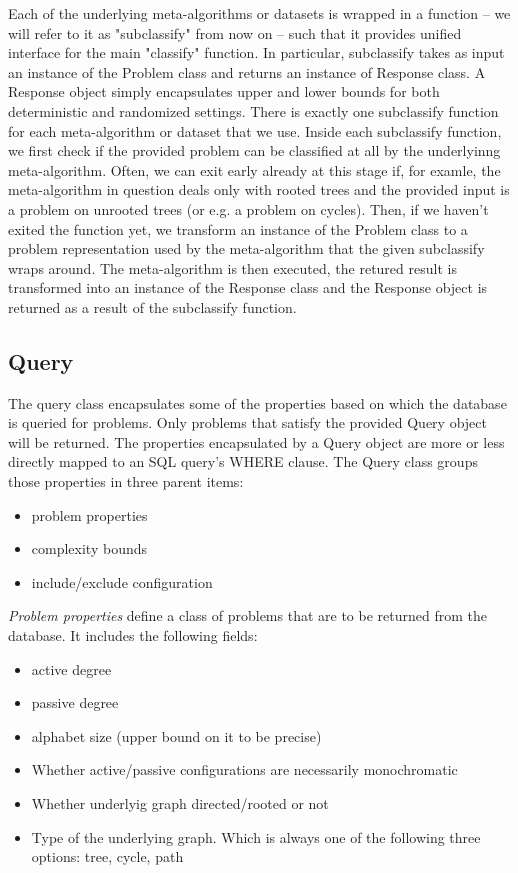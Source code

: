 Each of the underlying meta-algorithms or datasets is wrapped
in a function -- we will refer to it as "subclassify" from now on -- such
that it provides unified interface for the main
"classify" function. In particular, subclassify takes
as input an instance of the Problem class and
returns an instance of Response class. A Response object
simply encapsulates upper and lower bounds for both
deterministic and randomized settings. There is
exactly one subclassify function for each meta-algorithm
or dataset that we use. Inside each subclassify function,
we first check if the provided problem can be classified
at all by the underlyinng meta-algorithm. Often, we can
exit early already at this stage if, for examle, the meta-algorithm
in question deals only with rooted trees and the provided input is a 
problem on unrooted trees (or e.g. a problem on cycles). Then,
if we haven't exited the function yet,
we transform an instance of the Problem class to a problem
representation used by the meta-algorithm that the given
subclassify wraps around. The meta-algorithm is then executed,
the retured result is transformed into an instance of the
Response class and the Response object is returned as
a result of the subclassify function.

\subsection{Query}

The query class encapsulates some of the properties
based on which the database is queried for problems.
Only problems that satisfy the provided Query object will be
returned. The properties encapsulated by a Query object are
more or less directly mapped to an SQL query's WHERE clause.
The Query class groups those properties in three parent items:

\begin{itemize}
  \item problem properties
  \item complexity bounds
  \item include/exclude configuration
\end{itemize}

\emph{Problem properties} define a class of problems that are to be
returned from the database. It includes the following fields:

\begin{itemize}
  \item active degree
  \item passive degree
  \item alphabet size (upper bound on it to be precise)
  \item Whether active/passive configurations are necessarily monochromatic
  \item Whether underlyig graph directed/rooted or not
  \item Type of the underlying graph. Which is always one of the following three
  options: tree, cycle, path
\end{itemize}

